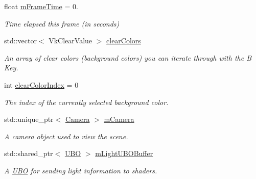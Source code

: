 \begin{DoxyCompactItemize}
\mbox{\label{class_vk_app_a41eb2e5a8085ec8cf975795ed4604334}} 
float \mbox{\hyperlink{class_vk_app_a41eb2e5a8085ec8cf975795ed4604334}{m\+Frame\+Time}} = 0.
\begin{DoxyCompactList}\small\item\em Time elapsed this frame (in seconds) \end{DoxyCompactList}\item 
std\+::vector$<$ Vk\+Clear\+Value $>$ \mbox{\hyperlink{class_vk_app_a3a52b89d13e9ef9b0c7fb3176ae95d3a}{clear\+Colors}}
\begin{DoxyCompactList}\small\item\em An array of clear colors (background colors) you can iterate through with the \textquotesingle{}B\textquotesingle{} Key. \end{DoxyCompactList}\item 
\mbox{\label{class_vk_app_a0312eb2a1776b01cc801d62bee5fedb1}} 
int \mbox{\hyperlink{class_vk_app_a0312eb2a1776b01cc801d62bee5fedb1}{clear\+Color\+Index}} = 0
\begin{DoxyCompactList}\small\item\em The index of the currently selected background color. \end{DoxyCompactList}\item 
\mbox{\label{class_vk_app_a4f8cc9c9b0698560ff96048e14a60661}} 
std\+::unique\+\_\+ptr$<$ \mbox{\hyperlink{class_camera}{Camera}} $>$ \mbox{\hyperlink{class_vk_app_a4f8cc9c9b0698560ff96048e14a60661}{m\+Camera}}
\begin{DoxyCompactList}\small\item\em A camera object used to view the scene. \end{DoxyCompactList}\item 
\mbox{\label{class_vk_app_ab736b45437e554b1fbe1eda9994fe6ef}} 
std\+::shared\+\_\+ptr$<$ \mbox{\hyperlink{struct_u_b_o}{U\+BO}} $>$ \mbox{\hyperlink{class_vk_app_ab736b45437e554b1fbe1eda9994fe6ef}{m\+Light\+U\+B\+O\+Buffer}}
\begin{DoxyCompactList}\small\item\em A \mbox{\hyperlink{struct_u_b_o}{U\+BO}} for sending light information to shaders. \end{DoxyCompactList}\item 
\mbox{\label{class_vk_app_a951b5277de9dc1f0e49fee15d3163ae2}} 

\end{DoxyCompactItemize}
